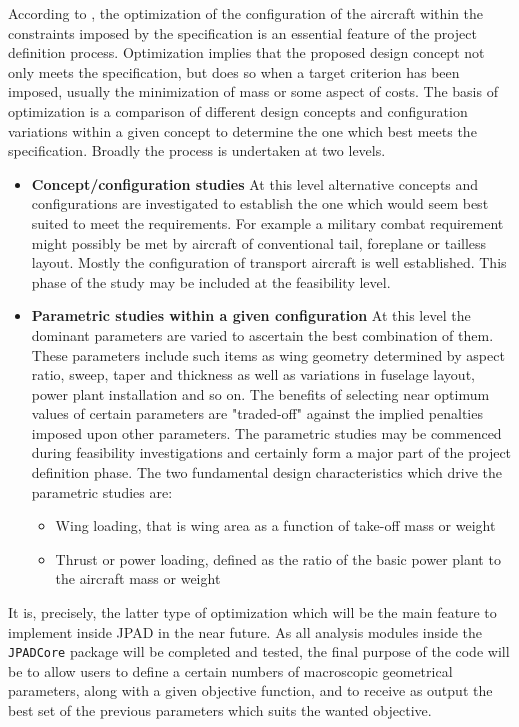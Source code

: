 \bigskip
\noindent
According to \cite{howe2000aircraft}, the optimization of the configuration of the aircraft within the constraints imposed by the specification is an essential feature of the project definition process. Optimization implies that the proposed design concept not only meets the specification, but does so when a target criterion has been imposed, usually the minimization of mass or some aspect of costs.
%
The basis of optimization is a comparison of different design concepts and configuration variations within a given concept to determine the one which best meets the specification. Broadly the process is undertaken at two levels.
%
\begin{itemize}
\item \textbf{Concept/configuration studies} At this level alternative concepts and configurations are investigated to establish the one which would seem best suited to meet the requirements. For example a military combat requirement might possibly be met by aircraft of conventional tail, foreplane or tailless layout. Mostly the configuration of transport aircraft is well established. This phase of the study may be included at the feasibility level.
\item \textbf{Parametric studies within a given configuration} At this level the dominant parameters are varied to ascertain the best combination of them. These parameters include such items as wing geometry determined by aspect ratio, sweep, taper and thickness as well as variations in fuselage layout, power plant installation and so on. The benefits of selecting near optimum values of certain parameters are "traded-off" against the implied penalties
imposed upon other parameters. The parametric studies may be commenced during feasibility investigations and certainly form a major part of the project definition phase. The two fundamental design characteristics which drive the parametric studies are:
\begin{itemize}
\item Wing loading, that is wing area as a function of take-off mass or weight
\item Thrust or power loading, defined as the ratio of the basic power plant to the aircraft mass or weight
\end{itemize}
\end{itemize}
%
It is, precisely, the latter type of optimization which will be the main feature to implement inside \gls{JPAD} in the near future. As all analysis modules inside the \lstinline[language=Java]!JPADCore! package will be completed and tested, the final purpose of the code will be to allow users to define a certain numbers of macroscopic geometrical parameters, along with a given objective function, and to receive as output the best set of the previous parameters which suits the wanted objective.















